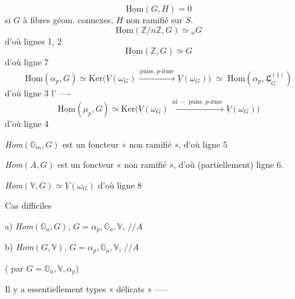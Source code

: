 \documentclass[11pt,a4paper]{article}
\begin{document}
\[ \underline{\mathrm{Hom}}(G,H) = 0 \]
si $G$ à fibres géom. connexes, $H$ non ramifié sur $S$.
\[ \underline{\mathrm{Hom}}(\mathbb{Z}/n\mathbb{Z}, G) \simeq {}_nG \]
d'où lignes 1, 2
\[ \underline{\mathrm{Hom}}(\mathbb{Z}, G) \simeq G \]
d'où ligne 7
\[
\underline{\mathrm{Hom}}(\alpha_p, G) \simeq \mathrm{Ker}\bigl(\underline{V}(\omega_G) \xrightarrow{\ \text{puiss. $p$-ième}\ } \underline{V}(\omega_G)\bigr)
\;\simeq\; \underline{\mathrm{Hom}}(\alpha_p, \underline{\mathfrak{L}}^{(1)}_G)
\]
d'où ligne 3  l'\ill{} \ill{} ----
\[
\underline{\mathrm{Hom}}(\mu_p, G) \simeq \mathrm{Ker}\bigl(\underline{V}(\omega_G) \xrightarrow{\ \text{id $-$ puiss. $p$-ième}\ } \underline{V}(\omega_G)\bigr)
\]
d'où ligne 4

\emph{Hom}$(\mathbb{G}_m, G)$ est un foncteur « non ramifié », d'où ligne 5

\emph{Hom}$(A, G)$ est un foncteur « non ramifié », d'où (partiellement) ligne 6.

\emph{Hom}$(\mathbb{V}, G) \simeq \underline{V}(\omega_G)$ \quad d'où ligne 8

Cas difficiles

a) \emph{Hom}$(\mathbb{G}_a, G)$, \quad $G = \alpha_p, \mathbb{G}_a, \mathbb{V}$, $/\!/A$

b) \emph{Hom}$(G, \mathbb{V})$, \quad $G = \alpha_p, \mathbb{G}_a, \mathbb{V}$, $/\!/A$

( \ill{} par $G = \mathbb{G}_a, \mathbb{V}, \alpha_p$)

Il y a essentiellement   types « délicats » -----
\end{document}
